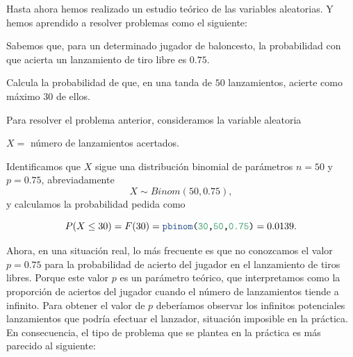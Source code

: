 \documentclass[
  notoc,
  nobib,
  degree=inf]{mnye}
\newcommand{\DecValTok}[1]{\textcolor[rgb]{0.00,0.00,0.81}{#1}}
\newcommand{\KeywordTok}[1]{\textcolor[rgb]{0.13,0.29,0.53}{\textbf{#1}}}
\newcommand{\NormalTok}[1]{#1}
\renewcommand{\DecValTok}[1]{\textcolor[RGB]{64, 160, 112}{\texttt{#1}}}
\renewcommand{\KeywordTok}[1]{\textcolor[rgb]{0.13,0.29,0.53}{\texttt{#1}}}
\renewcommand{\NormalTok}[1]{\texttt{#1}}
\begin{document}
Hasta ahora hemos realizado un estudio teórico de las variables aleatorias. Y hemos aprendido a resolver problemas como el siguiente:

\begin{ebox}{}
Sabemos que, para un determinado jugador de baloncesto, la probabilidad con que acierta un lanzamiento de tiro libre es \(0.75\).

Calcula la probabilidad de que, en una tanda de \(50\) lanzamientos, acierte como máximo \(30\) de ellos.

\end{ebox}

Para resolver el problema anterior, consideramos la variable aleatoria

\begin{center}
\(X =\) número de lanzamientos acertados.

\end{center}

Identificamos que \(X\) sigue una distribución binomial de parámetros \(n=50\) y \(p=0.75\), abreviadamente \[X\sim Binom(50,0.75),\] y calculamos la probabilidad pedida como

\[
  P(X\le 30) = F(30) =  \KeywordTok{pbinom}\NormalTok{(}\DecValTok{30}\NormalTok{,} \DecValTok{50}\NormalTok{,} \DecValTok{0.75}\NormalTok{)} = 0.0139.
\]

Ahora, en una situación real, lo más frecuente es que no conozcamos el valor \(p=0.75\) para la probabilidad de acierto del jugador en el lanzamiento de tiros libres. Porque este valor \(p\) es un parámetro teórico, que interpretamos como la proporción de aciertos del jugador cuando el número de lanzamientos tiende a infinito. Para obtener el valor de \(p\) deberíamos observar los infinitos potenciales lanzamientos que podría efectuar el lanzador, situación imposible en la práctica. En consecuencia, el tipo de problema que se plantea en la práctica es más parecido al siguiente:
\end{document}

